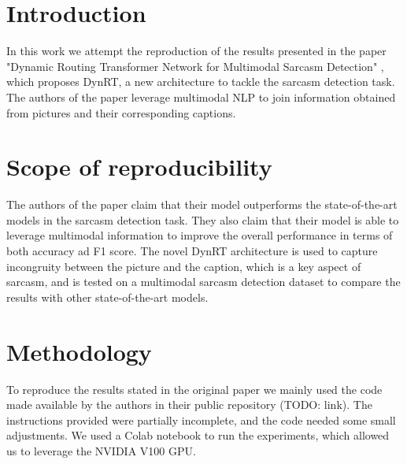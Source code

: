 \section{Introduction}
In this work we attempt the reproduction of the results presented in the paper "Dynamic Routing Transformer Network for Multimodal Sarcasm Detection" \cite{tian-etal-2023-dynamic}, which proposes DynRT, a new architecture to tackle the sarcasm detection task. The authors of the paper leverage multimodal NLP to join information obtained from pictures and their corresponding captions. 

\section{Scope of reproducibility}
\label{sec:claims}

The authors of the paper claim that their model outperforms the state-of-the-art models in the sarcasm detection task. They also claim that their model is able to leverage multimodal information to improve the overall performance in terms of both accuracy ad F1 score.
The novel DynRT architecture is used to capture incongruity between the picture and the caption, which is a key aspect of sarcasm, and is tested on a multimodal sarcasm detection dataset to compare the results with other state-of-the-art models.
 



\section{Methodology}
To reproduce the results stated in the original paper we mainly used the code made available by the authors in their public repository (TODO: link). The instructions provided were partially incomplete, and the code needed some small adjustments. We used a Colab notebook to run the experiments, which allowed us to leverage the NVIDIA V100 GPU.

